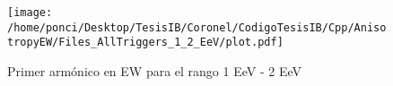 \begin{figure}[H]
    \begin{small}
        \begin{center}
            \texttt{[image: /home/ponci/Desktop/TesisIB/Coronel/CodigoTesisIB/Cpp/AnisotropyEW/Files\_AllTriggers\_1\_2\_EeV/plot.pdf]}
        \end{center}
        \caption{Primer armónico en EW para el rango 1 EeV - 2 EeV}
        \label{fig:}
    \end{small}
\end{figure}


